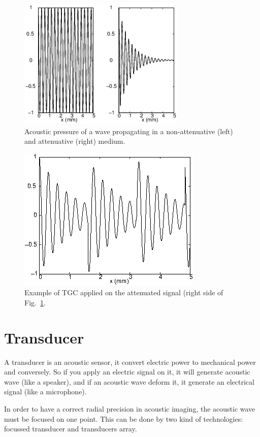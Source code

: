 \documentclass[a4paper,twoside,11pt]{article}
\begin{document}
\begin{figure}[htb]
	\centering
		\includegraphics{image/attenuative_medium}
	\caption{Acoustic pressure of a wave propagating in a non-attenuative 
(left) and attenuative (right) medium.}
	\label{fig:attenuative medium}
\end{figure}

\begin{figure}[htb]
	\centering
		\includegraphics{image/tgc_example}
	\caption{Example of TGC applied on the attenuated signal (right side of 
Fig.~\ref{fig:attenuative medium}.}
	\label{fig:tgc example}
\end{figure}



\clearpage
\section{Transducer}
\label{sec:Transducer}

A transducer is an acoustic sensor, it convert electric power to mechanical 
power and conversely. So if you apply an electric signal on it, it will 
generate acoustic wave (like a speaker), and if an acoustic wave deform it, it 
generate an electrical signal (like a microphone).

In order to have a correct radial precision in acoustic imaging, the acoustic 
wave must be focused on one point. This can be done by two kind of technologies: 
focussed transducer and transducers array.
\end{document}

